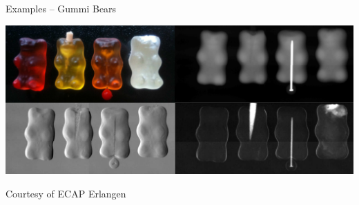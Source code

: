 \begin{frame}[c]{Examples -- Gummi Bears}
    \begin{center}
        \centering{}
        \includegraphics[width=\textwidth]{images/gummi.png}
    \end{center}

    \begin{center}
        \begin{flushright}
            \scriptsize Courtesy of ECAP Erlangen~\cite{bopp18}
        \end{flushright}
    \end{center}
\end{frame}

